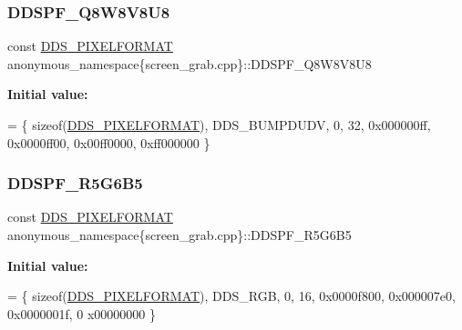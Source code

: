 \subsubsection{\texorpdfstring{D\+D\+S\+P\+F\+\_\+\+Q8\+W8\+V8\+U8}{DDSPF\_Q8W8V8U8}}
{\footnotesize\ttfamily const \mbox{\hyperlink{structanonymous__namespace_02screen__grab_8cpp_03_1_1_d_d_s___p_i_x_e_l_f_o_r_m_a_t}{D\+D\+S\+\_\+\+P\+I\+X\+E\+L\+F\+O\+R\+M\+AT}} anonymous\+\_\+namespace\{screen\+\_\+grab.\+cpp\}\+::D\+D\+S\+P\+F\+\_\+\+Q8\+W8\+V8\+U8}

{\bfseries Initial value\+:}
\begin{DoxyCode}
= 
        \{ \textcolor{keyword}{sizeof}(\mbox{\hyperlink{struct_d_d_s___p_i_x_e_l_f_o_r_m_a_t}{DDS\_PIXELFORMAT}}), DDS\_BUMPDUDV, 0, 32, 0x000000ff, 0x0000ff00, 0x00ff0000, 
      0xff000000 \}
\end{DoxyCode}
\mbox{\label{namespaceanonymous__namespace_02screen__grab_8cpp_03_ae60aa93e2086a7ab9dc82f03ce9bdf5e}} 
\subsubsection{\texorpdfstring{D\+D\+S\+P\+F\+\_\+\+R5\+G6\+B5}{DDSPF\_R5G6B5}}
{\footnotesize\ttfamily const \mbox{\hyperlink{structanonymous__namespace_02screen__grab_8cpp_03_1_1_d_d_s___p_i_x_e_l_f_o_r_m_a_t}{D\+D\+S\+\_\+\+P\+I\+X\+E\+L\+F\+O\+R\+M\+AT}} anonymous\+\_\+namespace\{screen\+\_\+grab.\+cpp\}\+::D\+D\+S\+P\+F\+\_\+\+R5\+G6\+B5}

{\bfseries Initial value\+:}
\begin{DoxyCode}
=
        \{ \textcolor{keyword}{sizeof}(\mbox{\hyperlink{struct_d_d_s___p_i_x_e_l_f_o_r_m_a_t}{DDS\_PIXELFORMAT}}), DDS\_RGB, 0, 16, 0x0000f800, 0x000007e0, 0x0000001f, 0
      x00000000 \}
\end{DoxyCode}
\mbox{\label{namespaceanonymous__namespace_02screen__grab_8cpp_03_a5f4abe66329196fac9a996779d08a52c}} 
